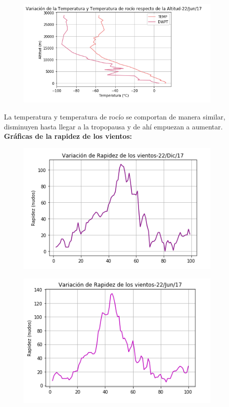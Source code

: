 \documentclass[a4paper]{article}
\begin{document}
\begin{figure}[h!]
  \includegraphics[width=10cm]{graf6.png}
  \centering
  \label{fig:10}
\end{figure}

La temperatura y temperatura de rocío se comportan de manera similar, disminuyen hasta llegar a la tropopausa y de ahí empuezan a aumentar.\\

\textbf{Gráficas de la rapidez de los vientos:}

\begin{figure}[h!]
  \includegraphics[width=10cm]{graf7.png}
  \centering
  \label{fig:11}
\end{figure}

\begin{figure}[h!]
  \includegraphics[width=10cm]{graf8.png}
  \centering
  \label{fig:12}
\end{figure}
\end{document}
